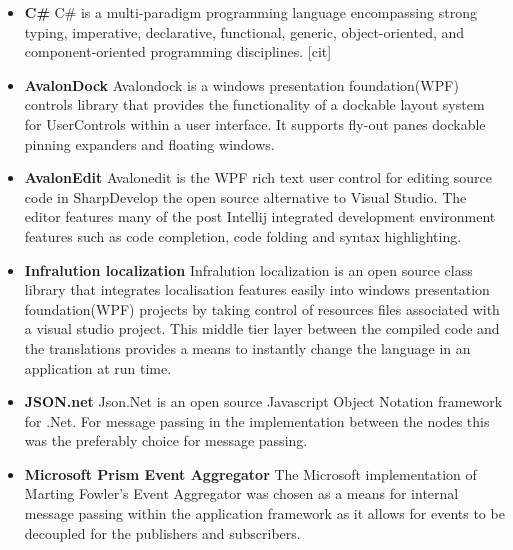 		\begin{itemize}
			\item \textbf{C\#} 
				\newline
				C\# is a multi-paradigm programming language encompassing strong typing, imperative, 
				declarative, functional, generic, object-oriented, and component-oriented programming disciplines. [cit]
		
			\item \textbf{AvalonDock} 
				\newline				
				Avalondock is a windows presentation foundation(WPF) controls library that provides the 
				functionality of a dockable layout system for UserControls within a user interface.  It supports fly-out panes
				dockable pinning expanders and floating windows.				
		
			\item \textbf{AvalonEdit} 
				\newline						
				Avalonedit is the WPF rich text user control for editing source code in SharpDevelop the open source 
				alternative to Visual Studio.  The editor features many of the post Intellij integrated development environment features
				such as code completion, code folding and syntax highlighting.
				
			\item \textbf{Infralution localization} 
				\newline						
				Infralution localization is an open source class library that integrates localisation features easily into
				windows presentation foundation(WPF) projects by taking control of resources files associated with a visual studio project.  
				This middle tier layer between the compiled code and the translations provides a means to instantly change
				the language in an application at run time.
				
			\item \textbf{JSON.net}	
				\newline								
				Json.Net is an open source Javascript Object Notation framework for .Net.  
				For message passing in the implementation between the nodes this was the preferably choice for message passing.
				
			\item \textbf{Microsoft Prism Event Aggregator}	
				\newline								
				The Microsoft implementation of Marting Fowler's Event Aggregator was chosen as a means for internal message
				passing within the application framework as it allows for events to be decoupled for the publishers and subscribers.
				

\end{itemize}
